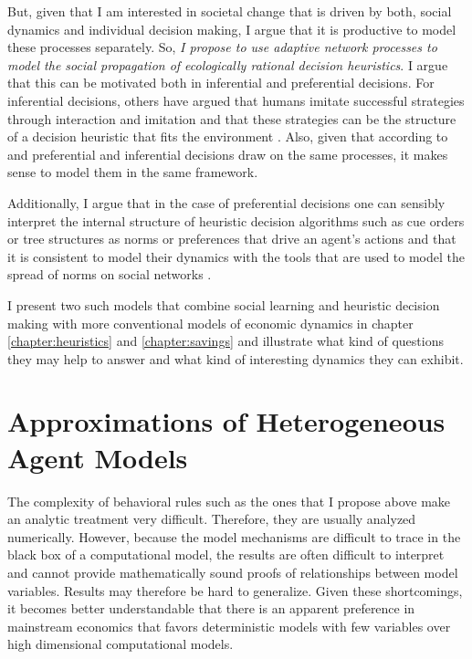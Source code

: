 But, given that I am interested in societal change that is driven by both, social dynamics and individual decision making, I argue that it is productive to model these processes separately. So, \emph{I propose to use adaptive network processes to model the social propagation of ecologically rational decision heuristics}.
I argue that this can be motivated both in inferential and preferential decisions. For inferential decisions, others have argued that humans imitate successful strategies through interaction and imitation \citep{Bandura1971, Traulsen2010} and that these strategies can be the structure of a decision heuristic that fits the environment \citep{Garcia-Retamero2009}. Also, given that according to \cite{Weber2009} and \cite{Gigerenzer2011} preferential and inferential decisions draw on the same processes, it makes sense to model them in the same framework. 

Additionally, I argue that in the case of preferential decisions one can sensibly interpret the internal structure of heuristic decision algorithms such as cue orders or tree structures as norms or preferences that drive an agent's actions and that it is consistent to model their dynamics with the tools that are used to model the spread of norms on social networks \citep[P2]{Mueller-Hansen2017}.

I present two such models that combine social learning and heuristic decision making with more conventional models of economic dynamics in chapter \ref{chapter:heuristics} and \ref{chapter:savings} and illustrate what kind of questions they may help to answer and what kind of interesting dynamics they can exhibit.

\section{Approximations of Heterogeneous Agent Models}

The complexity of behavioral rules such as the ones that I propose above make an analytic treatment very difficult. Therefore, they are usually analyzed numerically. However, because the model mechanisms are difficult to trace in the black box of a computational model, the results are often difficult to interpret and cannot provide mathematically sound proofs of relationships between model variables. Results may therefore be hard to generalize. Given these shortcomings, it becomes better understandable that there is an apparent preference in mainstream economics that favors deterministic models with few variables over high dimensional computational models.

